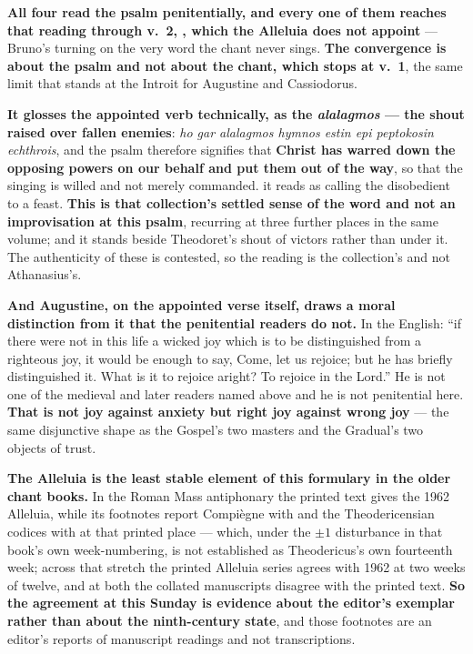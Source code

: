 \textbf{All four read the psalm penitentially, and every one of them reaches
that reading through v.~2, ,
which the Alleluia does not appoint} --- Bruno's turning on the very word
 the chant never sings. \textbf{The convergence is about the psalm
and not about the chant, which stops at v.~1}, the same limit that stands at the
Introit for Augustine and Cassiodorus.

\begin{witnessnote}
 \textbf{It glosses the appointed verb technically, as the
\emph{alalagmos} --- the shout raised over fallen enemies}: \emph{ho gar
alalagmos hymnos estin epi peptokosin echthrois}, and the psalm therefore
signifies that \textbf{Christ has warred down the opposing powers on our
behalf and put them out of the way}, so that the singing is willed and not
merely commanded.  it reads as calling the disobedient to a feast.
\textbf{This is that collection's settled sense of the word and not an
improvisation at this psalm}, recurring at three further places in the same
volume; and it stands beside Theodoret's shout of victors rather than under it.
The authenticity of these  is contested, so the reading is
the collection's and not Athanasius's.
\end{witnessnote}

\textbf{And Augustine, on the appointed verse itself, draws a moral distinction
from it that the penitential readers do not.} In the  English: ``if there were not in this life a wicked joy
which is to be distinguished from a righteous joy, it would be enough to say,
Come, let us rejoice; but he has briefly distinguished it. What is it to rejoice
aright? To rejoice in the Lord.'' He is not one of the medieval and later
readers named above and he is not penitential here. \textbf{That is not joy
against anxiety but right joy against wrong joy} --- the same disjunctive shape
as the Gospel's two masters and the Gradual's two objects of trust.

\textbf{The Alleluia is the least stable element of this formulary in the older
chant books.} In the Roman Mass antiphonary the printed text gives
 the 1962 Alleluia, while its footnotes report Compiègne
with  and the Theodericensian codices with
 at that printed place --- which, under the
\emph{$\pm1$} disturbance in that book's own week-numbering, is
not established as Theodericus's own fourteenth week; across that stretch the
printed Alleluia series
agrees with 1962 at two weeks of twelve, and at both the collated manuscripts
disagree with the printed text. \textbf{So the agreement at this Sunday is
evidence about the editor's exemplar rather than about the ninth-century
state}, and those footnotes are an editor's reports of manuscript readings and
not transcriptions.

